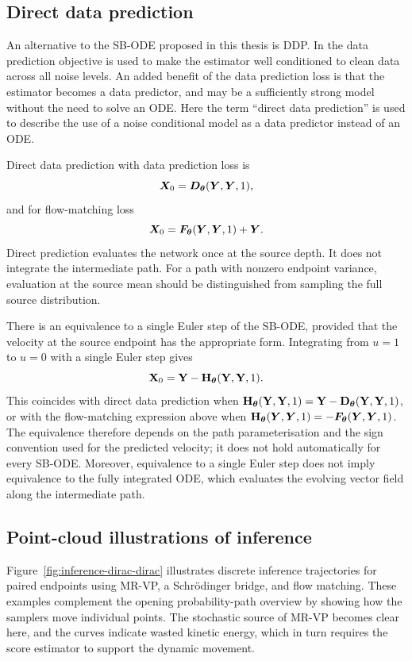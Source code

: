 \subsection{Direct data prediction}
An alternative to the \ac{SB}-\ac{ODE} proposed in this thesis is \ac{DDP}. In  the data prediction objective is used to make the estimator well conditioned to clean data across all noise levels. An added benefit of the data prediction loss is that the estimator becomes a data predictor, and may be a sufficiently strong model without the need to solve an \ac{ODE}. Here the term ``direct data prediction'' is used to describe the use of a noise conditional model as a data predictor instead of an \ac{ODE}.

Direct data prediction with data prediction loss is
\[
{\bm{X}}_0={\bm{D}}_{\bm{\theta}}({\bm{Y}}, {\bm{Y}},1),
\]
and for flow-matching loss
\[
{\bm{X}}_0={\bm{F}}_{\bm{\theta}}({\bm{Y}}, {\bm{Y}},1) + {\bm{Y}}.
\]
Direct prediction evaluates the network once at the source depth. It does not integrate the intermediate path. For a path with nonzero endpoint variance, evaluation at the source mean should be distinguished from sampling the full source distribution.

There is an equivalence to a single Euler step of the \ac{SB}-\ac{ODE}, provided that the velocity at the source endpoint has the appropriate form. Integrating from $u=1$ to $u=0$ with a single Euler step gives
\[
{{\mathbf{X}}}_0={\mathbf{Y}}-{\mathbf{H}}_{\bm{\theta}}({\mathbf{Y}},{\mathbf{Y}},1).
\]
This coincides with direct data prediction when ${\mathbf{H}}_{\bm{\theta}}({\mathbf{Y}},{\mathbf{Y}},1)={\mathbf{Y}}-{\mathbf{D}}_{\bm{\theta}}({\mathbf{Y}},{\mathbf{Y}},1)$, or with the flow-matching expression above when ${\mathbf{H}}_{\bm{\theta}}({\bm{Y}},{\bm{Y}},1)=-{\bm{F}}_{\bm{\theta}}({\bm{Y}},{\bm{Y}},1)$. The equivalence therefore depends on the path parameterisation and the sign convention used for the predicted velocity; it does not hold automatically for every \ac{SB}-\ac{ODE}. Moreover, equivalence to a single Euler step does not imply equivalence to the fully integrated \ac{ODE}, which evaluates the evolving vector field along the intermediate path.




\subsection{Point-cloud illustrations of inference}
Figure~\ref{fig:inference-dirac-dirac} illustrates discrete inference trajectories for paired endpoints using \ac{MR-VP}, a Schr\"odinger bridge, and flow matching. These examples complement the opening probability-path overview by showing how the samplers move individual points. The stochastic source of \ac{MR-VP} becomes clear here, and the curves indicate wasted kinetic energy, which in turn requires the score estimator to support the dynamic movement.

